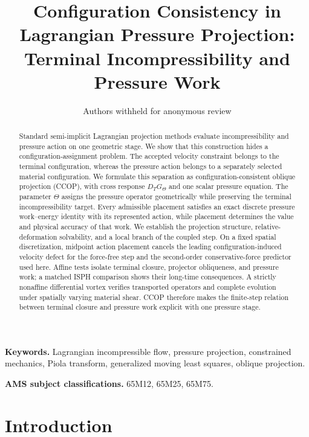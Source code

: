 \documentclass[11pt]{article}
\title{Configuration Consistency in Lagrangian Pressure Projection: Terminal Incompressibility and Pressure Work}
\author{Authors withheld for anonymous review}
\date{}
\theoremstyle{plain}
\theoremstyle{definition}
\theoremstyle{remark}
\begin{document}
\maketitle

\begin{abstract}
Standard semi-implicit Lagrangian projection methods evaluate incompressibility and pressure action on one geometric stage. We show that this construction hides a configuration-assignment problem. The accepted velocity constraint belongs to the terminal configuration, whereas the pressure action belongs to a separately selected material configuration. We formulate this separation as configuration-consistent oblique projection (CCOP), with cross response \(D_TG_\Theta\) and one scalar pressure equation. The parameter \(\Theta\) assigns the pressure operator geometrically while preserving the terminal incompressibility target. Every admissible placement satisfies an exact discrete pressure work--energy identity with its represented action, while placement determines the value and physical accuracy of that work. We establish the projection structure, relative-deformation solvability, and a local branch of the coupled step. On a fixed spatial discretization, midpoint action placement cancels the leading configuration-induced velocity defect for the force-free step and the second-order conservative-force predictor used here. Affine tests isolate terminal closure, projector obliqueness, and pressure work; a matched ISPH comparison shows their long-time consequences. A strictly nonaffine differential vortex verifies transported operators and complete evolution under spatially varying material shear. CCOP therefore makes the finite-step relation between terminal closure and pressure work explicit with one pressure stage.
\end{abstract}

\noindent\textbf{Keywords.}
Lagrangian incompressible flow, pressure projection, constrained mechanics,
Piola transform, generalized moving least squares, oblique projection.

\noindent\textbf{AMS subject classifications.}
65M12, 65M25, 65M75.

\section{Introduction}
\label{sec:introduction}
\end{document}
